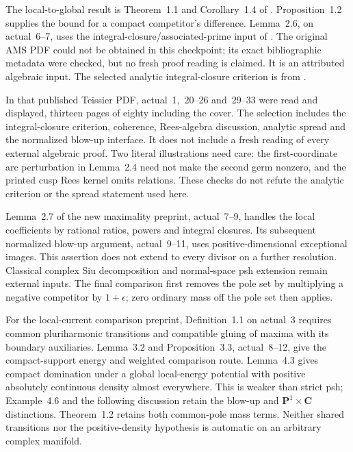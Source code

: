The local-to-global result is Theorem~1.1 and Corollary~1.4 of
\cite{DoHiep26MaximalityV1}. Proposition~1.2 supplies the bound
for a compact competitor's difference. Lemma~2.6, on actual~6--7,
uses the integral-closure/associated-prime input of
\cite{McAdam80AnalyticSpread}. The original AMS PDF could not
be obtained in this checkpoint; its exact bibliographic metadata
were checked, but no fresh proof reading is claimed. It is an
attributed algebraic input. The selected analytic integral-closure
criterion is from \cite[Theorem~2.1]{LejeuneTeissier08}.

In that published Teissier PDF, actual~1,~20--26 and~29--33
were read and displayed, thirteen pages of eighty including the
cover. The selection includes the integral-closure criterion,
coherence, Rees-algebra discussion, analytic spread and the
normalized blow-up interface. It does not include a fresh reading
of every external algebraic proof. Two literal illustrations need
care: the first-coordinate arc perturbation in Lemma~2.4 need
not make the second germ nonzero, and the printed cusp Rees
kernel omits relations. These checks do not refute the analytic
criterion or the spread statement used here.

Lemma~2.7 of the new maximality preprint, actual~7--9, handles
the local coefficients by rational ratios, powers and integral
closures. Its subsequent normalized blow-up argument, actual~9--11,
uses positive-dimensional exceptional images. This assertion
does not extend to every divisor on a further resolution.
Classical complex Siu decomposition and normal-space psh
extension remain external inputs. The final comparison first
removes the pole set by multiplying a negative competitor by
\(1+\epsilon\); zero ordinary mass off the pole set then applies.

For the local-current comparison preprint, Definition~1.1 on
actual~3 requires common pluriharmonic transitions and compatible
gluing of maxima with its boundary auxiliaries. Lemma~3.2 and
Proposition~3.3, actual~8--12, give the compact-support energy
and weighted comparison route. Lemma~4.3 gives compact
domination under a global local-energy potential with positive
absolutely continuous density almost everywhere. This is weaker
than strict psh; Example~4.6 and the following discussion retain the blow-up and
\(\mathbf P^1\times\mathbf C\) distinctions. Theorem~1.2
retains both common-pole mass terms. Neither shared transitions
nor the positive-density hypothesis is automatic on an arbitrary
complex manifold.

